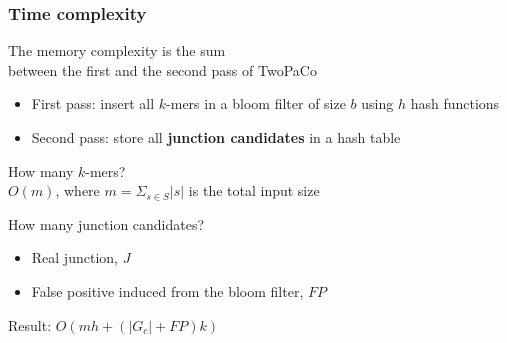 \begin{frame}
  
	\frametitle{Time complexity}

  \centering
	
	The memory complexity is the sum \\ between the first and the second pass of TwoPaCo \\
	
	\bigskip
	
	\begin{itemize}
	  \item First pass: insert all $k$-mers in a bloom filter of size $b$ using $h$ hash functions
	  \item Second pass: store all \textbf{junction candidates} in a hash table
	\end{itemize}
	
	\bigskip
	
	How many $k$-mers? \\
	
	$O(m)$, where $m = \Sigma_{s \in S}{ |s| }$ is the total input size
	
	\bigskip
	 
	How many junction candidates?
	
	\begin{itemize}
	  \item Real junction, $J$
	  \item False positive induced from the bloom filter, $FP$
	\end{itemize}

	\medskip
	
	Result: $O(mh + (|G_{c}| + FP)k)$
	
	
\end{frame}



